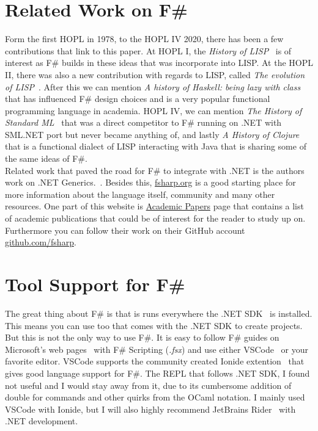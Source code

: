 \documentclass[12pt]{article}
\begin{document}
\newpage

\section{Related Work on F\#}

Form the first HOPL in 1978, to the HOPL IV 2020, there has been a few contributions that link to this paper.
At HOPL I, the \textit{History of LISP}~\cite{mccarthy_history_1978} is of interest as F\# builds in these ideas that was incorporate into LISP. At the HOPL II, there was also a new contribution with regards to LISP, called \textit{The evolution of LISP}~\cite{steele_evolution_1993}. After this we can mention \textit{A history of Haskell: being lazy with class}~\cite{hudak_history_2007} that has influenced F\# design choices and is a very popular functional programming language in academia. HOPL IV, we can mention \textit{The History of Standard ML}~\cite{macqueen_history_2020} that was a direct competitor to F\# running on .NET with SML.NET port but never became anything of, and lastly \textit{A History of Clojure}~\cite{hickey_history_2020} that is a functional dialect of LISP interacting with Java that is sharing some of the same ideas of F\#.\\

Related work that paved the road for F\# to integrate with .NET is the authors work on .NET Generics.~\cite{syme_ilx_2001}. Besides this, \href{https://fsharp.org}{fsharp.org} is a good starting place for more information about the language itself, community and many other resources. One part of this website is 
\href{https://fsharp.org/teaching/research.html}{Academic Papers} page that contains a list of academic publications that could be of interest for the reader to study up on.
Furthermore you can follow their work on their GitHub account \href{https://github.com/fsharp}{github.com/fsharp}. \\

\section{Tool Support for F\#}
The great thing about F\# is that is runs everywhere the .NET SDK~\cite{dykstra_net_nodate} is installed.
This means you can use  too that comes with the .NET SDK to create projects.
But this is not the only way to use F\#. It is easy to follow F\# guides on Microsoft's web pages~\cite{carter_get_nodate} with F\# Scripting (\textit{.fsx}) and use either VSCode~\cite{microsoft_visual_nodate} or your favorite editor.
VSCode supports the community created Ionide extention~\cite{noauthor_ionide_nodate} that gives good language support for F\#. The REPL that follows .NET SDK, I found not useful and I would stay away from it, due to its cumbersome addition of double \codeblock{;;} for commands and other quirks from the OCaml notation.
I mainly used VSCode with Ionide, but I will also highly recommend JetBrains Rider~\cite{jetbrains_rider_nodate} with .NET development.
\end{document}
